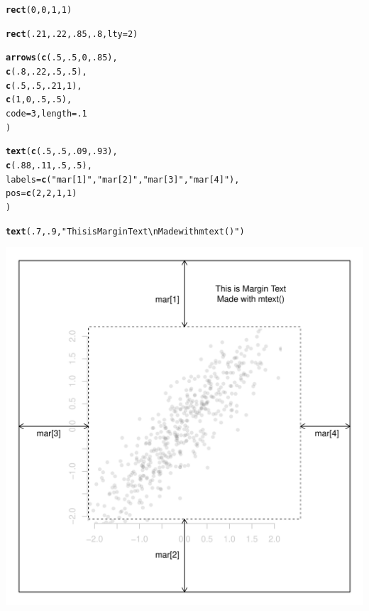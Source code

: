 \documentclass{tufte-book}\usepackage[]{graphicx}\usepackage[]{color}
\makeatletter
\def\maxwidth{ %
  \ifdim\Gin@nat@width>\linewidth
    \linewidth
  \else
    \Gin@nat@width
  \fi
}
\newcommand{\hlnum}[1]{\textcolor[rgb]{0.686,0.059,0.569}{#1}}%
\newcommand{\hlstr}[1]{\textcolor[rgb]{0.192,0.494,0.8}{#1}}%
\newcommand{\hlstd}[1]{\textcolor[rgb]{0.345,0.345,0.345}{#1}}%
\newcommand{\hlkwc}[1]{\textcolor[rgb]{0.333,0.667,0.333}{#1}}%
\newcommand{\hlkwd}[1]{\textcolor[rgb]{0.737,0.353,0.396}{\textbf{#1}}}%
\newenvironment{kframe}{%
 \def\at@end@of@kframe{}%
 \ifinner\ifhmode%
  \def\at@end@of@kframe{\end{minipage}}%
  \begin{minipage}{\columnwidth}%
 \fi\fi%
 \def\FrameCommand##1{\hskip\@totalleftmargin \hskip-\fboxsep
 \colorbox{shadecolor}{##1}\hskip-\fboxsep
     \hskip-\linewidth \hskip-\@totalleftmargin \hskip\columnwidth}%
 \MakeFramed {\advance\hsize-\width
   \@totalleftmargin\z@ \linewidth\hsize
   \@setminipage}}%
 {\par\unskip\endMakeFramed%
 \at@end@of@kframe}
\newenvironment{knitrout}{}{} %
\makeatother
\begin{document}
\begin{footnotesize}
\begin{marginfigure}
\begin{tiny}
\begin{knitrout}
\begin{kframe}
\begin{alltt}
\hlkwd{rect}\hlstd{(}\hlnum{0}\hlstd{,} \hlnum{0}\hlstd{,} \hlnum{1}\hlstd{,} \hlnum{1}\hlstd{)}

\hlkwd{rect}\hlstd{(}\hlnum{.21}\hlstd{,} \hlnum{.22}\hlstd{,} \hlnum{.85}\hlstd{,} \hlnum{.8}\hlstd{,} \hlkwc{lty} \hlstd{=} \hlnum{2}\hlstd{)}

\hlkwd{arrows}\hlstd{(}\hlkwd{c}\hlstd{(}\hlnum{.5}\hlstd{,} \hlnum{.5}\hlstd{,} \hlnum{0}\hlstd{,} \hlnum{.85}\hlstd{),}
       \hlkwd{c}\hlstd{(}\hlnum{.8}\hlstd{,} \hlnum{.22}\hlstd{,} \hlnum{.5}\hlstd{,} \hlnum{.5}\hlstd{),}
       \hlkwd{c}\hlstd{(}\hlnum{.5}\hlstd{,} \hlnum{.5}\hlstd{,} \hlnum{.21}\hlstd{,} \hlnum{1}\hlstd{),}
       \hlkwd{c}\hlstd{(}\hlnum{1}\hlstd{,} \hlnum{0}\hlstd{,} \hlnum{.5}\hlstd{,} \hlnum{.5}\hlstd{),}
       \hlkwc{code} \hlstd{=} \hlnum{3}\hlstd{,} \hlkwc{length} \hlstd{=} \hlnum{.1}
       \hlstd{)}

\hlkwd{text}\hlstd{(}\hlkwd{c}\hlstd{(}\hlnum{.5}\hlstd{,} \hlnum{.5}\hlstd{,} \hlnum{.09}\hlstd{,} \hlnum{.93}\hlstd{),}
     \hlkwd{c}\hlstd{(}\hlnum{.88}\hlstd{,} \hlnum{.11}\hlstd{,} \hlnum{.5}\hlstd{,} \hlnum{.5}\hlstd{),}
     \hlkwc{labels} \hlstd{=} \hlkwd{c}\hlstd{(}\hlstr{"mar[1]"}\hlstd{,} \hlstr{"mar[2]"}\hlstd{,} \hlstr{"mar[3]"}\hlstd{,} \hlstr{"mar[4]"}\hlstd{),}
     \hlkwc{pos} \hlstd{=} \hlkwd{c}\hlstd{(}\hlnum{2}\hlstd{,} \hlnum{2}\hlstd{,} \hlnum{1}\hlstd{,} \hlnum{1}\hlstd{)}
     \hlstd{)}

\hlkwd{text}\hlstd{(}\hlnum{.7}\hlstd{,} \hlnum{.9}\hlstd{,} \hlstr{"This is Margin Text\textbackslash{}nMade with mtext()"}\hlstd{)}
\end{alltt}
\end{kframe}
\includegraphics[width=\maxwidth]{figure/unnamed-chunk-175-1} 


\end{knitrout}
\end{tiny}
\end{marginfigure}
\end{footnotesize}
\end{document}

